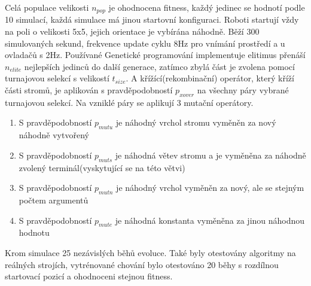 Celá populace velikosti $n_{pop}$ je ohodnocena fitness, každý jedinec se hodnotí podle 10 simulací, každá simulace má jinou startovní konfiguraci. Roboti startují vždy na poli o velikosti 5x5, jejich orientace je vybírána náhodně. Běží 300 simulovaných sekund, frekvence update cyklu 8Hz pro vnímání prostředí a u ovladačů s 2Hz. Používané Genetické programování implementuje elitimus přenáší $n_{elite}$ nejlepších jedinců do další generace, zatímco zbylá část je zvolena pomocí turnajovou selekcí s velikostí $t_{size}$. A křížící(rekombinační) operátor, který kříží části stromů, je aplikován s pravděpodobností $p_{xover}$ na všechny páry vybrané turnajovou selekcí. Na vzniklé páry se aplikují 3 mutační operátory. \par
\begin{enumerate}
    \item S pravděpodobností $p_{mutu}$ je náhodný vrchol stromu vyměněn za nový náhodně vytvořený 
    \item S pravděpodobností $p_{muts}$ je náhodná větev stromu a je  vyměněna za náhodně zvolený terminál(vyskytující se na této větvi)
    \item S pravděpodobností $p_{mutn}$ je náhodný vrchol vyměněn za nový, ale se stejným počtem argumentů
    \item S pravděpodobností $p_{mute}$ je náhodná konstanta vyměněna za jinou náhodnou hodnotu
\end{enumerate}
Krom simulace 25 nezávislých běhů evoluce. Také byly otestovány algoritmy na reálných strojích, vytrénované chování bylo otestováno 20 běhy s rozdílnou startovací pozicí a ohodnoceni stejnou fitness. 
\par 

